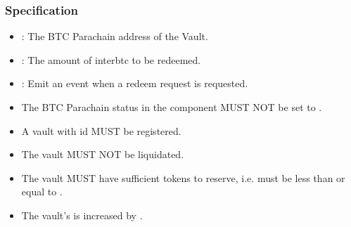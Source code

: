 \documentclass[a4paper,10pt,english]{sphinxmanual}
\begin{document}
\subsubsection{Specification}
\label{\detokenize{spec/vault-registry:id20}}


\begin{itemize}
\item {} 
: The BTC Parachain address of the Vault.

\item {} 
: The amount of interbtc to be redeemed.

\end{itemize}

\begin{itemize}
\item {} 
: Emit an event when a redeem request is requested.

\end{itemize}

\begin{itemize}
\item {} 
The BTC Parachain status in the {\hyperref[\detokenize{spec/security:security}]{}} component MUST NOT be set to .

\item {} 
A vault with id  MUST be registered.

\item {} 
The vault MUST NOT be liquidated.

\item {} 
The vault MUST have sufficient tokens to reserve, i.e.  must be less than or equal to .

\end{itemize}

\begin{itemize}
\item {} 
The vault’s  is increased by .

\end{itemize}
\end{document}
